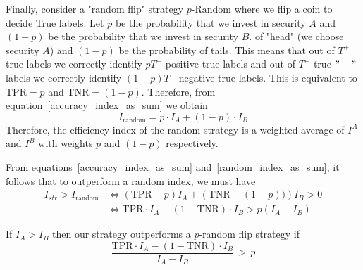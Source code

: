 \documentclass{article}
\begin{document}
Finally, consider a "random flip" strategy $p\text{-Random}$ where we flip a coin to decide True labels. 
Let $p$ be the probability that we invest in security $A$ and $(1-p)$ be the probability that we invest in security $B$.
of "head" (we choose security $A$) and $(1-p)$ be the probability of tails. This means that out of $T^{+}$ true labels we correctly identify $pT^{+}$ positive true labels and out of $T^{-}$ true $"-"$ labels we 
correctly identify $(1-p)T^{-}$ negative true labels. This is equivalent to $\text{TPR}=p$ and 
$\text{TNR}=(1-p)$.
Therefore, from equation~\eqref{accuracy_index_as_sum} we obtain
\begin{equation}
I_{\text{random}} = p \cdot I_{A} + (1-p)\cdot I_{B}
\label{random_index_as_sum}
\end{equation}
Therefore, the efficiency index of the random strategy is a weighted average of $I^{A}$ and $I^{B}$ with weights
$p$ and $(1-p)$ respectively. 

From equations~\eqref{accuracy_index_as_sum} and~\eqref{random_index_as_sum}, it follows that 
to outperform a random index, we must have
\begin{equation*}
\begin{split}
 I_{str} >  I_{\text{random}} & \Longleftrightarrow
(\text{TPR}-p)I_{A} +
\left(\text{TNR}- (1-p))\right)I_{B} >  0\\
& \Longleftrightarrow
 \text{TPR}\cdot I_{A}-(1-\text{TNR})\cdot I_{B} > p(I_{A}-I_{B})
\end{split}
\end{equation*}

If $I_{A}>I_{B}$ then our strategy outperforms a $p$-random flip strategy if
\begin{equation}
    \frac{\text{TPR}\cdot I_{A}-(1-\text{TNR})\cdot I_{B}}{I_{A}-I_{B}}\, > \, p
    \label{equivalent_p}
\end{equation}

\end{document}
